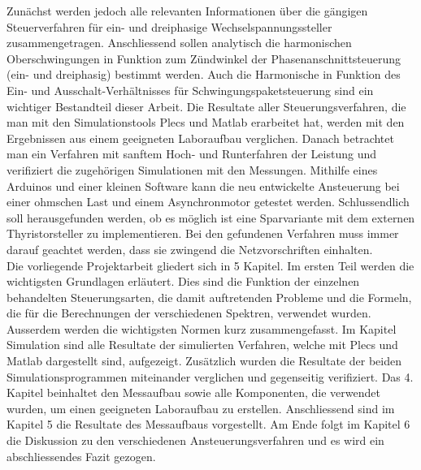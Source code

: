Zunächst werden jedoch alle relevanten Informationen über die gängigen Steuerverfahren für ein- und dreiphasige Wechselspannungssteller zusammengetragen. Anschliessend sollen analytisch die harmonischen Oberschwingungen in Funktion zum Zündwinkel der Phasenanschnittsteuerung (ein- und dreiphasig) bestimmt werden. Auch die Harmonische in Funktion des Ein- und Ausschalt-Verhältnisses für Schwingungspaketsteuerung sind ein wichtiger Bestandteil dieser Arbeit. Die Resultate aller Steuerungsverfahren, die man mit den Simulationstools Plecs und Matlab erarbeitet hat, werden mit den Ergebnissen aus einem geeigneten Laboraufbau verglichen. Danach betrachtet man ein Verfahren mit sanftem Hoch- und Runterfahren der Leistung und verifiziert die zugehörigen Simulationen mit den Messungen. Mithilfe eines Arduinos und einer kleinen Software kann die neu entwickelte Ansteuerung bei einer ohmschen Last und einem Asynchronmotor getestet werden. Schlussendlich soll herausgefunden werden, ob es möglich ist eine Sparvariante mit dem externen Thyristorsteller zu implementieren. Bei den gefundenen Verfahren muss immer darauf geachtet werden, dass sie zwingend die Netzvorschriften einhalten.\\
Die vorliegende Projektarbeit gliedert sich in 5 Kapitel. Im ersten Teil werden die wichtigsten Grundlagen erläutert. Dies sind die Funktion der einzelnen behandelten Steuerungsarten, die damit auftretenden Probleme und die Formeln, die für die Berechnungen der verschiedenen Spektren, verwendet wurden. Ausserdem werden die wichtigsten Normen kurz zusammengefasst. Im Kapitel Simulation sind alle Resultate der simulierten Verfahren, welche mit Plecs und Matlab dargestellt sind, aufgezeigt. Zusätzlich wurden die Resultate der beiden Simulationsprogrammen miteinander verglichen und gegenseitig verifiziert. Das 4. Kapitel beinhaltet den Messaufbau sowie alle Komponenten, die verwendet wurden, um einen geeigneten Laboraufbau zu erstellen. Anschliessend sind im Kapitel 5 die Resultate des Messaufbaus vorgestellt. Am Ende folgt im Kapitel 6 die Diskussion zu den verschiedenen Ansteuerungsverfahren und es wird ein abschliessendes Fazit gezogen.





















